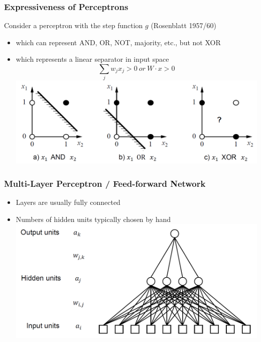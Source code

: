 \documentclass[conference]{styles/acmsiggraph}
\begin{document}
        \subsubsection{Expressiveness of Perceptrons}
            Consider a perceptron with the step function $g$ (Rosenblatt 1957/60)
            \begin{itemize}
                \item which can represent AND, OR, NOT, majority, etc., but not XOR
                \item which represents a linear separator in input space
                $$\sum\limits_{j} w_j x_j > 0 \ or\ W \cdot x > 0$$
                \includegraphics[width=1\textwidth]{imgs/ExpressivenessofPerceptrons.png}
            \end{itemize}
            
        \subsubsection{Multi-Layer Perceptron / Feed-forward Network}
            \begin{itemize}
                \item Layers are usually fully connected
                \item Numbers of hidden units typically chosen by hand\newline
                \includegraphics[width=1\textwidth]{imgs/MultiLayerPerceptron.png}
            \end{itemize}
\end{document}
